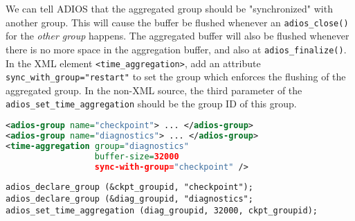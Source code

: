We can tell ADIOS that the aggregated group should be "synchronized" with another group. This will cause the buffer be flushed whenever an \verb+adios_close()+ for the {\em other group}  happens. The aggregated buffer will also be flushed whenever there is no more space in the aggregation buffer, and also at \verb+adios_finalize()+. In the XML element \verb+<time_aggregation>+, add an attribute \verb+sync_with_group="restart"+ to set the group which enforces the flushing of the aggregated group. In the non-XML source, the third parameter of the \verb+adios_set_time_aggregation+ should be the group ID of this group. 


\begin{lstlisting}[language=XML,caption=Set time aggregation for a group in XML with a synchronizing group]
<adios-group name="checkpoint"> ... </adios-group>
<adios-group name="diagnostics"> ... </adios-group>
<time-aggregation group="diagnostics" 
                  buffer-size=32000 
                  sync-with-group="checkpoint" />
\end{lstlisting}


\begin{lstlisting}[caption=Set time aggregation for a group in source code with a synchronizing group]
adios_declare_group (&ckpt_groupid, "checkpoint");
adios_declare_group (&diag_groupid, "diagnostics";
adios_set_time_aggregation (diag_groupid, 32000, ckpt_groupid);
\end{lstlisting}




